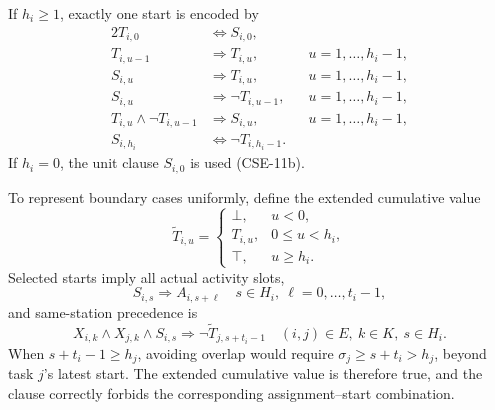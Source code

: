 \documentclass[]{interact}
\theoremstyle{plain}
\theoremstyle{definition}
\theoremstyle{remark}
\begin{document}
If $h_i\geq1$, exactly one start is encoded by
\begin{alignat}{2}
T_{i,0}&\Leftrightarrow S_{i,0}, && \tag{CSE-7}\\
T_{i,u-1}&\Rightarrow T_{i,u}, && u=1,\ldots,h_i-1, \tag{CSE-8}\\
S_{i,u}&\Rightarrow T_{i,u}, && u=1,\ldots,h_i-1, \tag{CSE-9}\\
S_{i,u}&\Rightarrow\neg T_{i,u-1}, && u=1,\ldots,h_i-1, \tag{CSE-10}\\
T_{i,u}\wedge\neg T_{i,u-1}&\Rightarrow S_{i,u}, && u=1,\ldots,h_i-1, \tag{CSE-11}\\
S_{i,h_i}&\Leftrightarrow\neg T_{i,h_i-1}. && \tag{CSE-11a}
\end{alignat}
If $h_i=0$, the unit clause $S_{i,0}$ is used (CSE-11b).

To represent boundary cases uniformly, define the extended cumulative value
\begin{equation}
\widetilde T_{i,u}=\begin{cases}
\bot,&u<0,\\
T_{i,u},&0\leq u<h_i,\\
\top,&u\geq h_i.
\end{cases}
\label{eq:extended-t}
\end{equation}
Selected starts imply all actual activity slots,
\begin{equation}
S_{i,s}\Rightarrow A_{i,s+\ell}
\quad s\in H_i,\ \ell=0,\ldots,t_i-1,
\tag{CSE-12}
\label{eq:cse12}
\end{equation}
and same-station precedence is
\begin{equation}
X_{i,k}\wedge X_{j,k}\wedge S_{i,s}
\Rightarrow\neg\widetilde T_{j,s+t_i-1}
\quad (i,j)\in E,\ k\in K,\ s\in H_i.
\tag{CSE-13}
\label{eq:cse13}
\end{equation}
When $s+t_i-1\geq h_j$, avoiding overlap would require $\sigma_j\geq s+t_i>h_j$, beyond task $j$'s latest start. The extended cumulative value is therefore true, and the clause correctly forbids the corresponding assignment--start combination.
\end{document}
